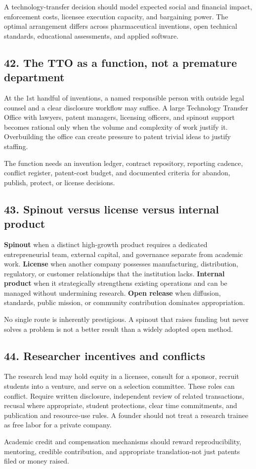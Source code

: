 A technology-transfer decision should model expected social and financial impact, enforcement costs, licensee execution capacity, and bargaining power. The optimal arrangement differs across pharmaceutical inventions, open technical standards, educational assessments, and applied software.

\subsection{42. The TTO as a function, not a premature department}

At the 1st handful of inventions, a named responsible person with outside legal counsel and a clear disclosure workflow may suffice. A large Technology Transfer Office with lawyers, patent managers, licensing officers, and spinout support becomes rational only when the volume and complexity of work justify it. Overbuilding the office can create pressure to patent trivial ideas to justify staffing.

The function needs an invention ledger, contract repository, reporting cadence, conflict register, patent-cost budget, and documented criteria for abandon, publish, protect, or license decisions.

\subsection{43. Spinout versus license versus internal product}

\textbf{Spinout} when a distinct high-growth product requires a dedicated entrepreneurial team, external capital, and governance separate from academic work. \textbf{License} when another company possesses manufacturing, distribution, regulatory, or customer relationships that the institution lacks. \textbf{Internal product} when it strategically strengthens existing operations and can be managed without undermining research. \textbf{Open release} when diffusion, standards, public mission, or community contribution dominates appropriation.

No single route is inherently prestigious. A spinout that raises funding but never solves a problem is not a better result than a widely adopted open method.

\subsection{44. Researcher incentives and conflicts}

The research lead may hold equity in a licensee, consult for a sponsor, recruit students into a venture, and serve on a selection committee. These roles can conflict. Require written disclosure, independent review of related transactions, recusal where appropriate, student protections, clear time commitments, and publication and resource-use rules. A founder should not treat a research trainee as free labor for a private company.

Academic credit and compensation mechanisms should reward reproducibility, mentoring, credible contribution, and appropriate translation-not just patents filed or money raised.
